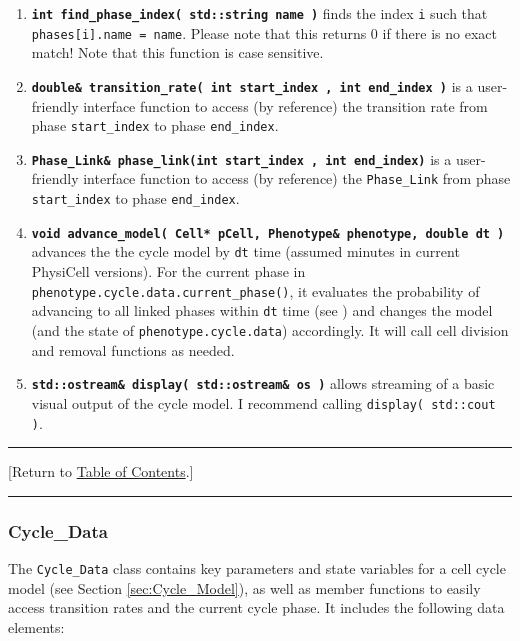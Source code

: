 \documentclass[12pt]{article}
\renewcommand{\v}{\verb}
\newcommand{\smallcode}[1]{\textbf{\texttt{#1}}}
\newcommand{\blue}[1]{\textcolor{blue}{#1}}
\newcommand{\DONE}{}%
\newcommand{\TOClink}{\begin{center}\hrule\vskip-10pt\phantom{.}\hfill[Return to \hyperlink{TOC}{Table of Contents}.]\hfill\phantom{.}\vskip3pt\hrule\end{center}}
\begin{document}
\begin{enumerate}
\item
\smallcode{int find\_phase\_index( std::string name )} finds the index \v|i| such that 
\v|phases[i].name = name|. Please note that this returns 0 if there is 
no exact match! Note that this function is case sensitive. 

\item 
\smallcode{double\& transition\_rate( int start\_index , int end\_index )} is a user-friendly interface function 
to access (by reference) the transition rate from phase \v|start_index| to phase 
\v|end_index|. 

\item 
\smallcode{Phase\_Link\& phase\_link(int start\_index , int end\_index)} is a user-friendly interface function 
to access (by reference) the \v|Phase_Link| from phase \v|start_index| to phase 
\v|end_index|. 

\item 
\smallcode{void advance\_model( Cell* pCell, Phenotype\& phenotype, double dt )} advances the the cycle model by 
\v|dt| time (assumed minutes in current PhysiCell versions). For the current phase \hfill\break
in \v|phenotype.cycle.data.current_phase()|, it evaluates the probability of advancing 
to all linked phases within \v|dt| time (see \cite{ref:PhysiCell}) and changes the model 
(and the state of \v|phenotype.cycle.data|) accordingly. It will call 
cell division and removal functions as needed. 

\item 
\smallcode{std::ostream\& display( std::ostream\& os )} allows streaming of a basic visual output of the 
cycle model. I recommend calling \v|display( std::cout )|.      

\end{enumerate}

\TOClink 

\subsubsection{Cycle\_Data \DONE}
\label{sec:Cycle_Data}
The \v|Cycle_Data| class contains key parameters and state variables for a 
cell cycle model (see Section \ref{sec:Cycle_Model}), as well as member functions to easily 
access transition rates and the current cycle phase. 
It includes the following data elements: 
\end{document}
